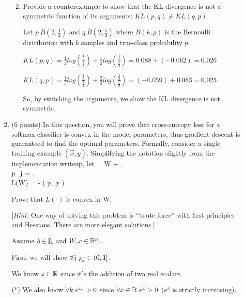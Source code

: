 \begin{enumerate}[resume]
\begin{enumerate}
\pagebreak
\item Provide a counterexample to show that the KL divergence is not a symmetric function of its arguments: $KL(p,q) \neq KL(q,p)$

Let $p ~ B(2, \frac{1}{2})$ and $q ~ B(2, \frac{1}{3})$ where $B(k, p)$ is the Bernoulli distribution with $k$ samples and true-class probability $p$.

$KL(p, q) = \frac{1}{2}log(\frac{\frac{1}{2}}{\frac{1}{3}}) + \frac{1}{2}log(\frac{\frac{1}{2}}{\frac{2}{3}}) = 0.088 + (-0.062) = 0.026$

$KL(q, p) = \frac{1}{3}log(\frac{\frac{1}{3}}{\frac{1}{2}}) + \frac{2}{3}log(\frac{\frac{2}{3}}{\frac{1}{2}}) = (-0.059) + 0.083 = 0.025$

So, by switching the arguments, we show the KL divergence is not symmetric.

\end{enumerate}

\pagebreak
\item
(6 points) In this question, you will prove that cross-entropy loss for a softmax classifier is convex in the model parameters, thus gradient
descent is guaranteed to find the optimal parameters. Formally, consider a single training example $(\vec{x}, y)$.
Simplifying the notation slightly from the implementation writeup, let
\beqn
{} = W + , \\
p_j = , \\
L(W) = - \log \left( p_{y} \right)
\eeqn

Prove that $L(\cdot)$ is convex in W.

%

[\emph{Hint:} One way of solving this problem is ``brute force'' with first principles and Hessians. There are more elegant solutions.]

Assume $b \in \mathbb{R}$ and $W, x \in \mathbb{R}^n$.

First, we will show $\forall j \thinspace\thinspace p_j \in (0, 1]$.

We know $z \in \mathbb{R}$ since it's the addition of two real scalars.

(*) We also know $\forall k \thinspace\thinspace e^{z_k} > 0$ since $\forall x\in\mathbb{R} \thinspace\thinspace e^x > 0$ ($e^x$ is strictly increasing).


\end{enumerate}

